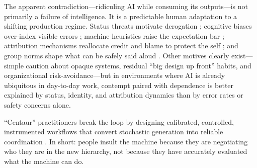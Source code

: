 \documentclass[11pt, a4paper, twocolumn]{article} %
\begin{document}
The apparent contradiction---ridiculing AI while consuming its outputs---is not primarily a failure of intelligence. It is a predictable human adaptation to a shifting production regime. Status threats motivate derogation \citep{Petriglieri2011UnderThreat,JostBanajiNosek2004Decade}; cognitive biases over-index visible errors \citep{BaumeisterEtAl2001Bad,TverskyKahneman1974Heuristics}; machine heuristics raise the expectation bar \citep{YangSundar2024MachineHeuristic}; attribution mechanisms reallocate credit and blame to protect the self \citep{MezulisEtAl2004SelfServing,Weiner1985Attribution}; and group norms shape what can be safely said aloud \citep{PrenticeMiller1993Pluralistic}. Other motives clearly exist---simple caution about opaque systems, residual ``big design up front'' habits, and organizational risk-avoidance---but in environments where AI is already ubiquitous in day-to-day work, contempt paired with dependence is better explained by status, identity, and attribution dynamics than by error rates or safety concerns alone.

``Centaur'' practitioners break the loop by designing calibrated, controlled, instrumented workflows that convert stochastic generation into reliable coordination \citep{DietvorstSimmonsMassey2018Overcoming,LeeSee2004TrustAutomation,Blomgren2025CoordinationShift}. In short: people insult the machine because they are negotiating who they are in the new hierarchy, not because they have accurately evaluated what the machine can do.

\newpage
\printbibliography
\end{document}
